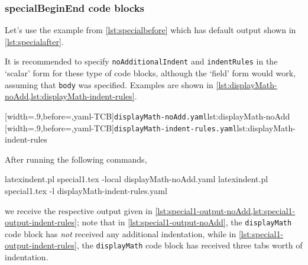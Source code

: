 \subsubsection{specialBeginEnd code blocks}
 Let's use the example from \vref{lst:specialbefore} which has default output shown in
 \vref{lst:specialafter}.

 \begin{example}
 It is recommended to specify \texttt{noAdditionalIndent} and \texttt{indentRules} in the
 `scalar' form for these type of code blocks, although the `field' form would work,
 assuming that \texttt{body} was specified. Examples are shown in
 \cref{lst:displayMath-noAdd,lst:displayMath-indent-rules}.
  

 \begin{cmhtcbraster}
  [width=.9\linewidth,before=\centering,yaml-TCB]{\texttt{displayMath-noAdd.yaml}}{lst:displayMath-noAdd}
  [width=.9\linewidth,before=\centering,yaml-TCB]{\texttt{displayMath-indent-rules.yaml}}{lst:displayMath-indent-rules}
 \end{cmhtcbraster}

 After running the following commands, 

 \begin{commandshell}
latexindent.pl special1.tex -local displayMath-noAdd.yaml  
latexindent.pl special1.tex -l displayMath-indent-rules.yaml  
\end{commandshell}

 we receive the respective output given in
 \cref{lst:special1-output-noAdd,lst:special1-output-indent-rules}; note that in
 \cref{lst:special1-output-noAdd}, the \texttt{displayMath} code block has \emph{not}
 received any additional indentation, while in \cref{lst:special1-output-indent-rules},
 the \texttt{displayMath} code block has received three tabs worth of indentation.

 \begin{cmhtcbraster}
 \end{cmhtcbraster}
 \end{example}

